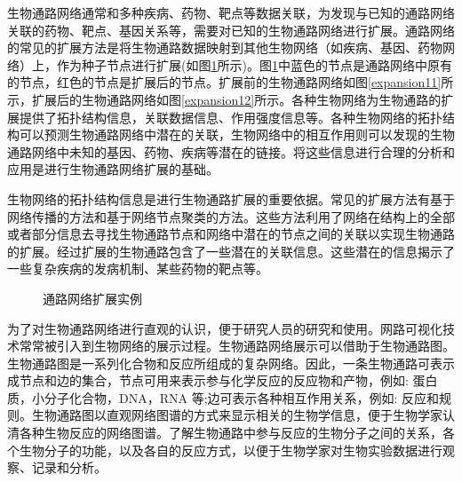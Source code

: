 生物通路网络通常和多种疾病、药物、靶点等数据关联，为发现与已知的通路网络关联的药物、靶点、基因关系等，需要对已知的生物通路网络进行扩展。通路网络的常见的扩展方法是将生物通路数据映射到其他生物网络（如疾病、基因、药物网络）上，作为种子节点进行扩展(如图\ref{fig1}所示)。图\ref{fig1}中蓝色的节点是通路网络中原有的节点，红色的节点是扩展后的节点。扩展前的生物通路网络如图\ref{expansion11}所示，扩展后的生物通路网络如图\ref{expansion12}所示。各种生物网络为生物通路的扩展提供了拓扑结构信息，关联数据信息、作用强度信息等。各种生物网络的拓扑结构可以预测生物通路网络中潜在的关联，生物网络中的相互作用则可以发现的生物通路网络中未知的基因、药物、疾病等潜在的链接。将这些信息进行合理的分析和应用是进行生物通路网络扩展的基础。

 生物网络的拓扑结构信息是进行生物通路扩展的重要依据。常见的扩展方法有基于网络传播的方法和基于网络节点聚类的方法。这些方法利用了网络在结构上的全部或者部分信息去寻找生物通路节点和网络中潜在的节点之间的关联以实现生物通路的扩展。经过扩展的生物通路包含了一些潜在的关联信息。这些潜在的信息揭示了一些复杂疾病的发病机制、某些药物的靶点等。



\begin{figure}{\label{fig1}}
  \centering
  \begin{minipage}{.95\linewidth}
    \setlength{\subfigcapskip}{-1bp}
    \centering
    \begin{minipage}{\textwidth}
      \centering
      \subfigure{\label{expansion11}}\addtocounter{subfigure}{-2}
      \subfigure{\subfigure[扩展前的生物通路网络]{\texttt{[image: 1-a]}}}
      \subfigure{\label{expansion12}}\addtocounter{subfigure}{-2}
      \subfigure{\subfigure[扩展后的生物通路网络]{\texttt{[image: 1-b]}}}
    \end{minipage}
	\caption[fig1]{通路网络扩展实例}
	\label{fig1}
  \end{minipage}
\end{figure}

为了对生物通路网络进行直观的认识，便于研究人员的研究和使用。网路可视化技术常常被引入到生物网络的展示过程。生物通路网络展示可以借助于生物通路图。生物通路图是一系列化合物和反应所组成的复杂网络。因此，一条生物通路可表示成节点和边的集合，节点可用来表示参与化学反应的反应物和产物，例如: 蛋白质，小分子化合物，DNA，RNA 等;边可表示各种相互作用关系，例如: 反应和规则。生物通路图以直观网络图谱的方式来显示相关的生物学信息，便于生物学家认清各种生物反应的网络图谱。了解生物通路中参与反应的生物分子之间的关系，各个生物分子的功能，以及各自的反应方式，以便于生物学家对生物实验数据进行观察、记录和分析。

